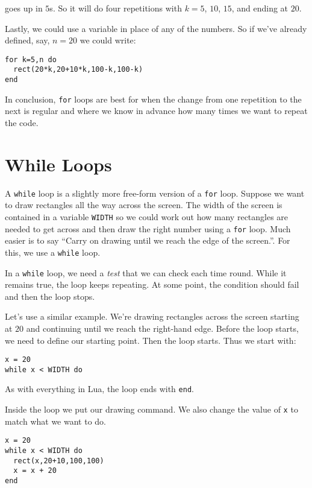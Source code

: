 \documentclass[
  xhtml,%
  use filename%
]{internet}
\begin{document}
\noindent goes up in \(5\)s.
So it will do four repetitions with \(k=5\), \(10\), \(15\), and ending at \(20\).

Lastly, we could use a variable in place of any of the numbers.
So if we've already defined, say, \(n=20\) we could write:

\begin{verbatim}
for k=5,n do
  rect(20*k,20+10*k,100-k,100-k)
end
\end{verbatim}

In conclusion, \verb+for+ loops are best for when the change from one repetition to the next is regular and where we know in advance how many times we want to repeat the code.


\section{While Loops}

A \verb+while+ loop is a slightly more free-form version of a \verb+for+ loop.
Suppose we want to draw rectangles all the way across the screen.
The width of the screen is contained in a variable \verb+WIDTH+ so we could work out how many rectangles are needed to get across and then draw the right number using a \verb+for+ loop.
Much easier is to say ``Carry on drawing until we reach the edge of the screen.''.
For this, we use a \verb+while+ loop.

In a \verb+while+ loop, we need a \emph{test} that we can check each time round.
While it remains true, the loop keeps repeating.
At some point, the condition should fail and then the loop stops.

Let's use a similar example.
We're drawing rectangles across the screen starting at \(20\) and continuing until we reach the right-hand edge.
Before the loop starts, we need to define our starting point.
Then the loop starts.
Thus we start with:

\begin{verbatim}
x = 20
while x < WIDTH do
\end{verbatim}

\noindent As with everything in Lua, the loop ends with \verb+end+.

Inside the loop we put our drawing command.
We also change the value of \verb+x+ to match what we want to do.

\begin{verbatim}
x = 20
while x < WIDTH do
  rect(x,20+10,100,100)
  x = x + 20
end
\end{verbatim}
\end{document}
